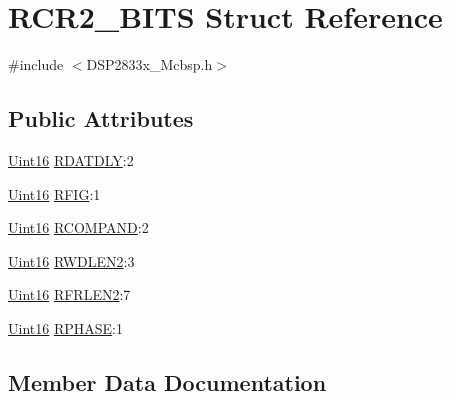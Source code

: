 \hypertarget{struct_r_c_r2___b_i_t_s}{}\section{R\+C\+R2\+\_\+\+B\+I\+T\+S Struct Reference}
\label{struct_r_c_r2___b_i_t_s}


{\ttfamily \#include $<$D\+S\+P2833x\+\_\+\+Mcbsp.\+h$>$}

\subsection*{Public Attributes}
\begin{DoxyCompactItemize}
\item 
\hyperlink{_d_s_p2833x___device_8h_a59a9f6be4562c327cbfb4f7e8e18f08b}{Uint16} \hyperlink{struct_r_c_r2___b_i_t_s_a61c01c83f33acac13cfef0d2de9314eb}{R\+D\+A\+T\+D\+L\+Y}\+:2
\item 
\hyperlink{_d_s_p2833x___device_8h_a59a9f6be4562c327cbfb4f7e8e18f08b}{Uint16} \hyperlink{struct_r_c_r2___b_i_t_s_ab134e48d8ecb13c8db88d528dcc020eb}{R\+F\+I\+G}\+:1
\item 
\hyperlink{_d_s_p2833x___device_8h_a59a9f6be4562c327cbfb4f7e8e18f08b}{Uint16} \hyperlink{struct_r_c_r2___b_i_t_s_a872f3388b7e09d028a7b57c8e3265c14}{R\+C\+O\+M\+P\+A\+N\+D}\+:2
\item 
\hyperlink{_d_s_p2833x___device_8h_a59a9f6be4562c327cbfb4f7e8e18f08b}{Uint16} \hyperlink{struct_r_c_r2___b_i_t_s_a34203dc15bd8448fdabe8a6e0a570249}{R\+W\+D\+L\+E\+N2}\+:3
\item 
\hyperlink{_d_s_p2833x___device_8h_a59a9f6be4562c327cbfb4f7e8e18f08b}{Uint16} \hyperlink{struct_r_c_r2___b_i_t_s_afb694fa2566a9714261ff1c8f178cf69}{R\+F\+R\+L\+E\+N2}\+:7
\item 
\hyperlink{_d_s_p2833x___device_8h_a59a9f6be4562c327cbfb4f7e8e18f08b}{Uint16} \hyperlink{struct_r_c_r2___b_i_t_s_ac3d269de16b331cad8edda778b704786}{R\+P\+H\+A\+S\+E}\+:1
\end{DoxyCompactItemize}


\subsection{Member Data Documentation}
\hypertarget{struct_r_c_r2___b_i_t_s_a872f3388b7e09d028a7b57c8e3265c14}{}
